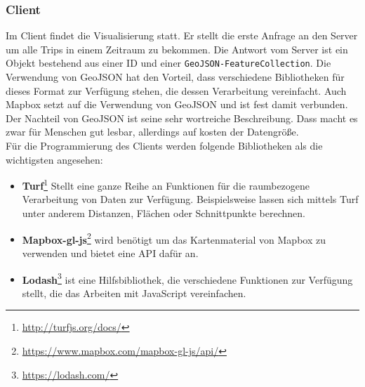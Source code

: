 \subsubsection{Client}
\label{ssub:client}
  Im Client findet die Visualisierung statt. Er stellt die erste Anfrage an den Server um alle Trips in einem Zeitraum zu bekommen. Die Antwort vom Server ist ein Objekt bestehend aus einer ID und einer \texttt{GeoJSON-FeatureCollection}. Die Verwendung von GeoJSON hat den Vorteil, dass verschiedene Bibliotheken für dieses Format zur Verfügung stehen, die dessen Verarbeitung vereinfacht. Auch Mapbox setzt auf die Verwendung von GeoJSON und ist fest damit verbunden. Der Nachteil von GeoJSON ist seine sehr wortreiche Beschreibung. Dass macht es zwar für Menschen gut lesbar, allerdings auf kosten der Datengröße.\\

  Für die Programmierung des Clients werden folgende Bibliotheken als die wichtigsten angesehen:

  \begin{itemize}[label={}]
    \item \textbf{Turf}\footnote{\url{http://turfjs.org/docs/}} Stellt eine ganze Reihe an Funktionen für die raumbezogene Verarbeitung von Daten zur Verfügung. Beispielsweise lassen sich mittels Turf unter anderem Distanzen, Flächen oder Schnittpunkte berechnen.

    \item \textbf{Mapbox-gl-js}\footnote{\url{https://www.mapbox.com/mapbox-gl-js/api/}} wird benötigt um das Kartenmaterial von Mapbox zu verwenden und bietet eine API dafür an.

    \item \textbf{Lodash}\footnote{\url{https://lodash.com/}} ist eine Hilfsbibliothek, die verschiedene Funktionen zur Verfügung stellt, die das Arbeiten mit JavaScript vereinfachen.

  \end{itemize}



